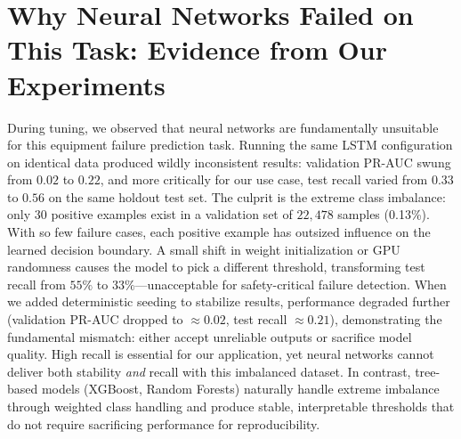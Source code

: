 \documentclass[11pt]{article}
\begin{document}
\section*{Why Neural Networks Failed on This Task: Evidence from Our Experiments}

During tuning, we observed that neural networks are fundamentally unsuitable for this equipment failure prediction task. Running the same LSTM configuration on identical data produced wildly inconsistent results: validation PR-AUC swung from $0.02$ to $0.22$, and more critically for our use case, test recall varied from $0.33$ to $0.56$ on the same holdout test set. The culprit is the extreme class imbalance: only $30$ positive examples exist in a validation set of $22{,}478$ samples (0.13\%). With so few failure cases, each positive example has outsized influence on the learned decision boundary. A small shift in weight initialization or GPU randomness causes the model to pick a different threshold, transforming test recall from $55\%$ to $33\%$---unacceptable for safety-critical failure detection. When we added deterministic seeding to stabilize results, performance degraded further (validation PR-AUC dropped to $\approx 0.02$, test recall $\approx 0.21$), demonstrating the fundamental mismatch: either accept unreliable outputs or sacrifice model quality. High recall is essential for our application, yet neural networks cannot deliver both stability \textit{and} recall with this imbalanced dataset. In contrast, tree-based models (XGBoost, Random Forests) naturally handle extreme imbalance through weighted class handling and produce stable, interpretable thresholds that do not require sacrificing performance for reproducibility.
\end{document}
